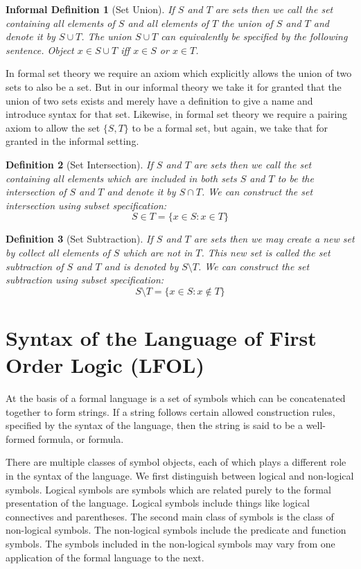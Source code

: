 \documentclass[12pt]{article}
\theoremstyle{break}
\newtheorem{definition}{Definition}[section]
\theoremstyle{break}
\theoremstyle{break}
\theoremstyle{break}
\theoremstyle{break}
\newtheorem{informal definition}[definition]{Informal Definition}
\begin{document}
\begin{informal definition}[Set Union]
If $S$ and $T$ are sets then we call the set containing all elements of $S$ and all elements of $T$ the union of $S$ and $T$ and denote it by $S\cup T$.
The union $S\cup T$ can equivalently be specified by the following sentence.
Object $x\in S\cup T$ iff $x \in S$ or $x\in T$.
\end{informal definition}
In formal set theory we require an axiom which explicitly allows the union of two sets to also be a set.
But in our informal theory we take it for granted that the union of two sets exists and merely have a definition to give a name and introduce syntax for that set.
Likewise, in formal set theory we require a pairing axiom to allow the set $\{S, T\}$ to be a formal set, but again, we take that for granted in the informal setting.

\begin{definition}[Set Intersection]
If $S$ and $T$ are sets then we call the set containing all elements which are included in both sets $S$ and $T$ to be the intersection of $S$ and $T$ and denote it by $S\cap T$.
We can construct the set intersection using subset specification:
$$
S\in T = \{x\in S: x\in T\}
$$
\end{definition}

\begin{definition}[Set Subtraction]
If $S$ and $T$ are sets then we may create a new set by collect all elements of $S$ which are not in $T$.
This new set is called the set subtraction of $S$ and $T$ and is denoted by $S\setminus T$.
We can construct the set subtraction using subset specification:
$$
S\setminus T = \{x\in S: x \not \in T\}
$$
\end{definition}



\newpage
\section{Syntax of the Language of First Order Logic (LFOL)}

At the basis of a formal language is a set of symbols which can be concatenated together to form strings.
If a string follows certain allowed construction rules, specified by the syntax of the language, then the string is said to be a well-formed formula, or formula.

There are multiple classes of symbol objects, each of which plays a different role in the syntax of the language.
We first distinguish between logical and non-logical symbols.
Logical symbols are symbols which are related purely to the formal presentation of the language.
Logical symbols include things like logical connectives and parentheses.
The second main class of symbols is the class of non-logical symbols.
The non-logical symbols include the predicate and function symbols.
The symbols included in the non-logical symbols may vary from one application of the formal language to the next.
\end{document}

